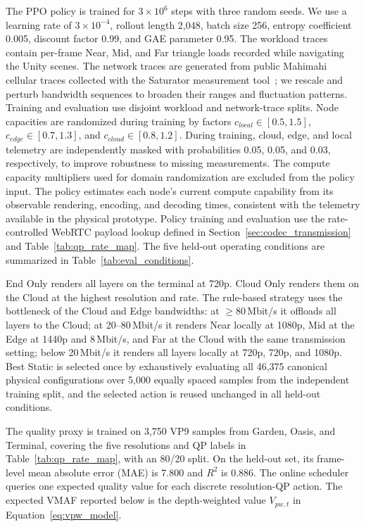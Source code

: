 \documentclass[10pt,journal,compsoc]{IEEEtran}
\begin{document}
The PPO policy is trained for $3\times10^{6}$ steps with three random seeds. We use a learning rate of $3\times10^{-4}$, rollout length 2,048, batch size 256, entropy coefficient 0.005, discount factor 0.99, and GAE parameter 0.95. The workload traces contain per-frame Near, Mid, and Far triangle loads recorded while navigating the Unity scenes. The network traces are generated from public Mahimahi cellular traces collected with the Saturator measurement tool~\cite{winstein_stochastic_2013}; we rescale and perturb bandwidth sequences to broaden their ranges and fluctuation patterns. Training and evaluation use disjoint workload and network-trace splits. Node capacities are randomized during training by factors $c_{local}\in[0.5,1.5]$, $c_{edge}\in[0.7,1.3]$, and $c_{cloud}\in[0.8,1.2]$.
During training, cloud, edge, and local telemetry are independently masked with probabilities 0.05, 0.05, and 0.03, respectively, to improve robustness to missing measurements. The compute capacity multipliers used for domain randomization are excluded from the policy input. The policy estimates each node's current compute capability from its observable rendering, encoding, and decoding times, consistent with the telemetry available in the physical prototype. Policy training and evaluation use the rate-controlled WebRTC payload lookup defined in Section~\ref{sec:codec_transmission} and Table~\ref{tab:qp_rate_map}. The five held-out operating conditions are summarized in Table~\ref{tab:eval_conditions}.

End Only renders all layers on the terminal at 720p. Cloud Only renders them on the Cloud at the highest resolution and rate. The rule-based strategy uses the bottleneck of the Cloud and Edge bandwidths: at $\ge80$\,Mbit/s it offloads all layers to the Cloud; at 20--80\,Mbit/s it renders Near locally at 1080p, Mid at the Edge at 1440p and 8\,Mbit/s, and Far at the Cloud with the same transmission setting; below 20\,Mbit/s it renders all layers locally at 720p, 720p, and 1080p. Best Static is selected once by exhaustively evaluating all 46,375 canonical physical configurations over 5,000 equally spaced samples from the independent training split, and the selected action is reused unchanged in all held-out conditions.

The quality proxy is trained on 3,750 VP9 samples from Garden, Oasis, and Terminal, covering the five resolutions and QP labels in Table~\ref{tab:qp_rate_map}, with an 80/20 split. On the held-out set, its frame-level mean absolute error (MAE) is 7.800 and $R^2$ is 0.886. The online scheduler queries one expected quality value for each discrete resolution-QP action. The expected VMAF reported below is the depth-weighted value $V_{pw,t}$ in Equation~\ref{eq:vpw_model}.
\end{document}
